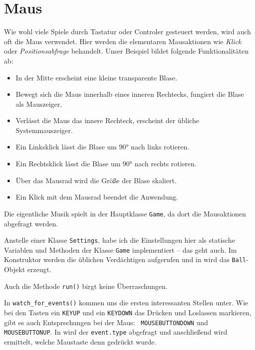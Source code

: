\section{Maus}

Wie wohl viele Spiele durch Tastatur oder Controler gesteuert werden, wird auch oft die Maus verwendet. Hier werden die elementaren Mausaktionen wie \emph{Klick} oder \emph{Positionsabfrage} behandelt. Unser Beispiel bildet folgende Funktionalitäten ab:
\begin{itemize}
	\item In der Mitte erscheint eine kleine transparente Blase.
	\item Bewegt sich die Maus innerhalb eines inneren Rechtecks, fungiert die Blase als Mauszeiger.
	\item Verlässt die Maus das innere Rechteck, erscheint der übliche Systemmauszeiger.
	\item Ein Linksklick lässt die Blase um $90°$ nach links rotieren.
	\item Ein Rechtsklick lässt die Blase um $90°$ nach rechts rotieren.
	\item Über das Mausrad wird die Größe der Blase skaliert.
	\item Ein Klick mit dem Mausrad beendet die Anwendung.
\end{itemize}


Die eigentliche Musik spielt in der Hauptklasse \texttt{Game}, da dort die Mausaktionen abgefragt werden. 

Anstelle einer Klasse \texttt{Settings}, habe ich die Einstellungen hier als statische Variablen und Methoden der Klasse \texttt{Game} implementiert -- das geht auch. Im Konstruktor werden die üblichen Verdächtigen aufgerufen und in  wird das \texttt{Ball}-Objekt erzeugt.



Auch die Methode \texttt{run()} birgt keine Überraschungen.


In \texttt{watch\_for\_events()} kommen uns die ersten interessanten Stellen unter. Wie bei den Tasten ein \texttt{KEYUP} und ein \texttt{KEYDOWN} das Drücken und Loslassen markieren, gibt es auch Entsprechungen bei der Maus:\  \texttt{MOUSEBUTTONDOWN} und \texttt{MOUSEBUTTONUP}. In  wird der \texttt{event.type} abgefragt und anschließend wird ermittelt, welche Maustaste denn gedrückt wurde. 

